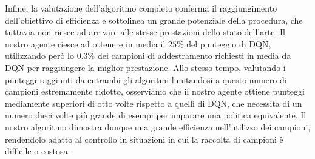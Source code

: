 Infine, la valutazione dell'algoritmo completo conferma il raggiungimento 
dell'obiettivo di efficienza e sottolinea un grande potenziale della procedura,
che tuttavia non riesce ad arrivare alle stesse prestazioni dello stato 
dell'arte.
Il nostro agente riesce ad ottenere in media il $25\%$ del punteggio di DQN, 
utilizzando per\`o lo $0.3\%$ dei campioni di addestramento richiesti in media
da DQN per raggiungere la miglior prestazione. 
Allo stesso tempo, valutando i punteggi raggiunti da entrambi gli algoritmi 
limitandosi a questo numero di campioni estremamente ridotto, osserviamo che
il nostro agente ottiene punteggi mediamente superiori di otto volte rispetto a 
quelli di DQN, che necessita di un numero dieci volte pi\`u grande di esempi 
per imparare una politica equivalente.
Il nostro algoritmo dimostra dunque una grande efficienza nell'utilizzo dei 
campioni, rendendolo adatto al controllo in situazioni in cui la raccolta
di campioni \`e difficile o costosa. 


































